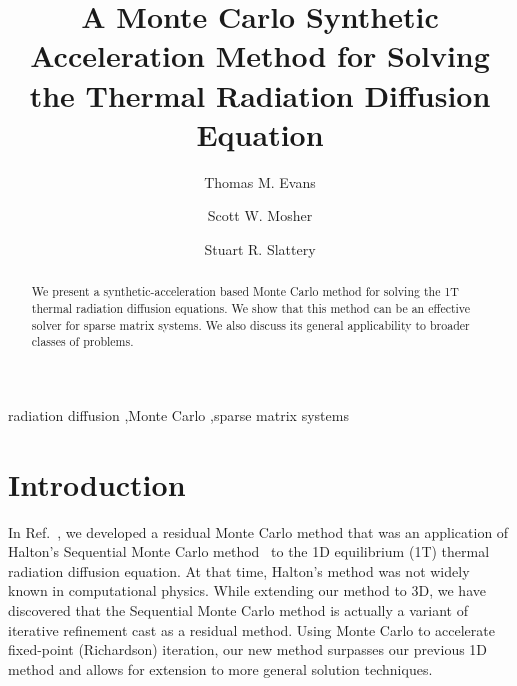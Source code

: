 \documentclass[preprint,12pt]{elsarticle}
\begin{document}
\begin{frontmatter}

  \title{A Monte Carlo Synthetic Acceleration Method for Solving the
    Thermal Radiation Diffusion Equation}

  \author[ornl]{Thomas M. Evans}

  \author[ornl]{Scott W. Mosher}

  \author[wisc]{Stuart R. Slattery}


  \address[ornl]{Oak Ridge National Laboratory, 
    1 Bethel Valley Rd., Oak Ridge, TN 378131 U.S.A.}
  \address[wisc]{University of Wisconsin-Madison, 1500 Engineering
    Dr., Madison, WI 53716 U.S.A.}

  \begin{abstract}

    We present a synthetic-acceleration based Monte Carlo method for
    solving the 1T thermal radiation diffusion equations.  We show
    that this method can be an effective solver for sparse matrix
    systems.  We also discuss its general applicability to broader
    classes of problems.

  \end{abstract}

  \begin{keyword}
    radiation diffusion \sep Monte Carlo \sep sparse matrix systems
  \end{keyword}

\end{frontmatter}

\section{Introduction}
\label{sec:introduction}

In Ref.~\cite{evans_2003}, we developed a residual Monte Carlo method
that was an application of Halton's Sequential Monte Carlo
method~\cite{halton_1962,halton_1994} to the 1D equilibrium (1T)
thermal radiation diffusion equation.  At that time, Halton's method
was not widely known in computational physics.  While extending our
method to 3D, we have discovered that the Sequential Monte Carlo
method is actually a variant of iterative refinement cast as a
residual method.  Using Monte Carlo to accelerate fixed-point
(Richardson) iteration, our new method surpasses our previous 1D
method and allows for extension to more general solution techniques.
\end{document}

